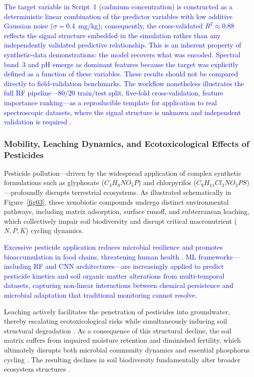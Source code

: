 \documentclass[environments,article,submit,pdftex,moreauthors]{Definitions/mdpi}
\begin{document}
\textcolor{blue}{The target variable in Script~1 (cadmium concentration) is constructed as a deterministic linear combination of the predictor variables with low additive Gaussian noise ($\sigma = 0.4$~mg/kg); consequently, the cross-validated $R^2 \approx 0.88$ reflects the signal structure embedded in the simulation rather than any independently validated predictive relationship. This is an inherent property of synthetic-data demonstrations: the model recovers what was encoded. Spectral band~3 and pH emerge as dominant features because the target was explicitly defined as a function of these variables. These results should not be compared directly to field-validation benchmarks. The workflow nonetheless illustrates the full RF pipeline---80/20 train/test split, five-fold cross-validation, feature importance ranking---as a reproducible template for application to real spectroscopic datasets, where the signal structure is unknown and independent validation is required \cite{MCLAUGHLIN1999143}.}

\subsubsection{Mobility, Leaching Dynamics, and Ecotoxicological Effects of
    Pesticides}\label{sec2.1.2}

Pesticide pollution—driven by the widespread application of complex synthetic formulations such as glyphosate ($C_3H_8NO_5P$) and chlorpyrifos ($C_9H_{11}Cl_3NO_3PS$)—profoundly disrupts terrestrial ecosystems. As illustrated schematically in Figure~\ref{fig03}, these xenobiotic compounds undergo distinct environmental pathways, including matrix adsorption, surface runoff, and subterranean leaching, which collectively impair soil biodiversity and disrupt critical macronutrient ($N, P, K$) cycling dynamics.

\textcolor{blue}{Excessive pesticide application reduces microbial resilience and promotes bioaccumulation in food chains, threatening human health \cite{GonzalezRodriguez2011,Nauanova2025}. ML frameworks---including RF and CNN architectures---are increasingly applied to predict pesticide kinetics and soil organic matter alterations from multi-temporal datasets, capturing non-linear interactions between chemical persistence and microbial adaptation that traditional monitoring cannot resolve.}

Leaching actively facilitates the penetration of pesticides into groundwater, thereby escalating ecotoxicological risks while simultaneously inducing soil structural degradation \cite{Toumi2025,PerezLucas2025}. As a consequence of this structural decline, the soil matrix suffers from impaired moisture retention \cite{Kelsey1968} and diminished fertility, which ultimately disrupts both microbial community dynamics and essential phosphorus cycling \cite{Ponder2002,Yasir2025}. The resulting declines in soil biodiversity fundamentally alter broader ecosystem structures \cite{Marcelino2024}. 
\end{document}
